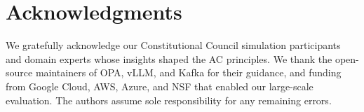 















\section*{Acknowledgments}
We gratefully acknowledge our Constitutional Council simulation participants and domain experts whose insights shaped the AC principles. We thank the open-source maintainers of OPA, vLLM, and Kafka for their guidance, and funding from Google Cloud, AWS, Azure, and NSF that enabled our large-scale evaluation. The authors assume sole responsibility for any remaining errors.

{\small


}




